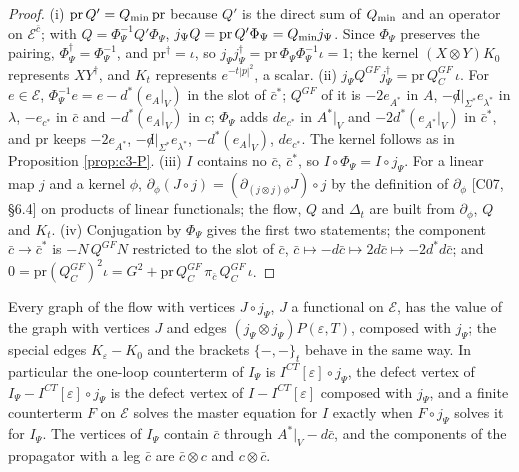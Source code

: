 \begin{proof}
(i) $\mathrm{pr}\,Q'=Q_{\rm min}\,\mathrm{pr}$ because $Q'$ is the direct sum of $Q_{\rm min}$ and an operator on $\mathscr E^{\bar c}$; with $Q=\Phi_\Psi^{-1}Q'\Phi_\Psi$, $j_\Psi Q=\mathrm{pr}\,Q'\Phi_\Psi=Q_{\rm min}j_\Psi$. Since $\Phi_\Psi$ preserves the pairing, $\Phi_\Psi^\dagger=\Phi_\Psi^{-1}$, and $\mathrm{pr}^\dagger=\iota$, so $j_\Psi j_\Psi^\dagger=\mathrm{pr}\,\Phi_\Psi\Phi_\Psi^{-1}\iota=1$; the kernel $(X\otimes Y)K_0$ represents $XY^\dagger$, and $K_t$ represents $e^{-t|p|^2}$, a scalar. (ii) $j_\Psi Q^{GF}j_\Psi^\dagger=\mathrm{pr}\,Q^{GF}_C\,\iota$. For $e\in\mathscr E$, $\Phi_\Psi^{-1}e=e-d^*(e_A|_V)$ in the slot of $\bar c^*$; $Q^{GF}$ of it is $-2e_{A^*}$ in $A$, $-{\not d}|_{\Sigma^*}e_{\lambda^*}$ in $\lambda$, $-e_{c^*}$ in $\bar c$ and $-d^*(e_A|_V)$ in $c$; $\Phi_\Psi$ adds $de_{c^*}$ in $A^*|_V$ and $-2d^*(e_{A^*}|_V)$ in $\bar c^*$, and $\mathrm{pr}$ keeps $-2e_{A^*}$, $-{\not d}|_{\Sigma^*}e_{\lambda^*}$, $-d^*(e_A|_V)$, $de_{c^*}$. The kernel follows as in Proposition \ref{prop:c3-P}. (iii) $I$ contains no $\bar c$, $\bar c^*$, so $I\circ\Phi_\Psi=I\circ j_\Psi$. For a linear map $j$ and a kernel $\phi$, $\partial_\phi(J\circ j)=(\partial_{(j\otimes j)\phi}J)\circ j$ by the definition of $\partial_\phi$ [C07, §6.4] on products of linear functionals; the flow, $Q$ and $\Delta_t$ are built from $\partial_\phi$, $Q$ and $K_t$. (iv) Conjugation by $\Phi_\Psi$ gives the first two statements; the component $\bar c\to\bar c^*$ is $-N\,Q^{GF}N$ restricted to the slot of $\bar c$, $\bar c\mapsto-d\bar c\mapsto2d\bar c\mapsto-2d^*d\bar c$; and $0=\mathrm{pr}(Q^{GF}_C)^2\iota=G^2+\mathrm{pr}\,Q^{GF}_C\,\pi_{\bar c}\,Q^{GF}_C\,\iota$.
\end{proof}

\begin{corollary}
\label{cor:c3-arity0}
Every graph of the flow with vertices $J\circ j_\Psi$, $J$ a functional on $\mathscr E$, has the value of the graph with vertices $J$ and edges $(j_\Psi\otimes j_\Psi)P(\varepsilon,T)$, composed with $j_\Psi$; the special edges $K_\varepsilon-K_0$ and the brackets $\{-,-\}_t$ behave in the same way. In particular the one-loop counterterm of $I_\Psi$ is $I^{CT}[\varepsilon]\circ j_\Psi$, the defect vertex of $I_\Psi-I^{CT}[\varepsilon]\circ j_\Psi$ is the defect vertex of $I-I^{CT}[\varepsilon]$ composed with $j_\Psi$, and a finite counterterm $F$ on $\mathscr E$ solves the master equation for $I$ exactly when $F\circ j_\Psi$ solves it for $I_\Psi$. The vertices of $I_\Psi$ contain $\bar c$ through $A^*|_V-d\bar c$, and the components of the propagator with a leg $\bar c$ are $\bar c\otimes c$ and $c\otimes\bar c$.
\end{corollary}

